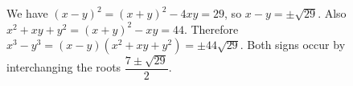 We have $(x-y)^2=(x+y)^2-4xy=29$, so $x-y=\pm\sqrt{29}$. Also $x^2+xy+y^2=(x+y)^2-xy=44$. Therefore $x^3-y^3=(x-y)(x^2+xy+y^2)=\boxed{\pm44\sqrt{29}}$. Both signs occur by interchanging the roots $\dfrac{7\pm\sqrt{29}}{2}$.
